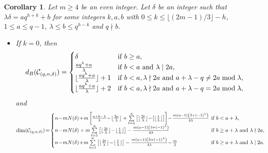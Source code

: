 \documentclass[journal,onecolumn]{IEEEtran}
\newtheorem{Corollary}{Corollary}
\begin{document}
\begin{Corollary}\label{example2}
 Let $m\geq 4$ be an even integer. Let $\delta$ be an integer such that $\lambda\delta=a q^{h+k}+b$ for some integers $k, a, b $ with    $0 \leq k\leq \lfloor (2m-1)/3\rfloor-h$,   
  $1\leq a \leq q-1$,     $\lambda\leq b\leq q^{h-k} $ and  $q\nmid b$. 
 \begin{itemize}
\item If $k=0$, then 
\begin{equation}\label{db1}
    d_B(\mathcal{C}_{(q,n,\delta)}) =\begin{cases}
        \delta&\hbox{if } b\geq a,\\
        \frac{aq^h+a}{\lambda}&\hbox{if }b<a \hbox{ and }\lambda \mid 2a,\\
      \lfloor  \frac{aq^h+a}{\lambda}\rfloor+1&\hbox{if } b<a,\lambda\nmid 2a \hbox{ and }a+\lambda-q\neq 2a \bmod \lambda,\\
      \lfloor  \frac{aq^h+a}{\lambda}\rfloor+2&\hbox{if } b<a,\lambda\nmid 2a \hbox{ and }a+\lambda-q = 2a \bmod \lambda,
    \end{cases}
\end{equation}
and 
\begin{equation}\label{69}
   \mathrm{dim}(\mathcal{C}_{(q,n,\delta)})\!=\!
    \begin{cases}
      n\!-\!mN(\delta)\!+\!m\left[\frac{a+b-\lambda}{\lambda}\!-\!\lfloor\frac{2a}{\lambda}\rfloor+\sum\limits_{t=1}^a\left[\lfloor \frac{2t}{\lambda}\rfloor\!-\![\lfloor \frac{t}{\lambda}\rfloor\right]\right] \!-\!\frac{m(a-1)\left(3+(-1)^{\lambda}\right)}{4\lambda}&\hspace{-6pt} \hbox{if }  b<a+\lambda, \\
n\!-\!m N(\delta)+m\sum\limits_{t=1}^a\left[\lfloor\frac{2t}{\lambda}\rfloor\!-\!\lfloor\frac{t}{\lambda}\rfloor\right]-\frac{m(a-1)\left(3+(-1)^{\lambda}\right)}{4\lambda}
 &\hspace{-6pt}\hbox{if } b\geq a+\lambda \hbox{ and }  \lambda\nmid 2a,\\
  n\!-\!m N(\delta)\!+\!m\sum\limits_{t=1}^a\left[\lfloor\frac{2t}{\lambda}\rfloor\!-\!\lfloor\frac{t}{\lambda}\rfloor\right]-\frac{m(a-1)\left(3+(-1)^{\lambda}\right)}{4\lambda}\!-\!\frac{m}{2}
 &\hspace{-6pt}\hbox{if } b\geq a+\lambda \hbox{ and }  \lambda\mid 2a.     
    \end{cases}
\end{equation}
 

\end{itemize}
\end{Corollary}
\end{document}
